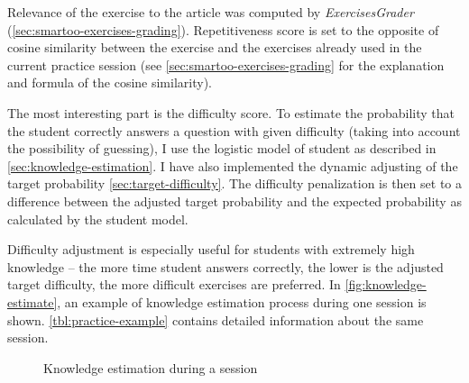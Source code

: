 \documentclass[12pt, twoside]{fithesis2}		%
\renewcommand{\_}{\leavevmode \kern0.07em\vbox{\hrule width0.4em}}
\begin{document}
Relevance of the exercise to the article was computed by \textit{ExercisesGrader}
(\autoref{sec:smartoo-exercises-grading}).
Repetitiveness score is set to the opposite of cosine similarity between the exercise and the exercises already used in the current practice session
(see \autoref{sec:smartoo-exercises-grading} for the explanation and formula of the cosine similarity).

The most interesting part is the difficulty score.
To estimate the probability that the student correctly answers a question with given difficulty (taking into account the possibility of guessing),
I use the logistic model of student as described in \autoref{sec:knowledge-estimation}.
I have also implemented the dynamic adjusting of the target probability \autoref{sec:target-difficulty}.
The difficulty penalization is then set to a difference between the adjusted target probability and the expected probability as calculated by the student model.

Difficulty adjustment is especially useful for students with extremely high knowledge -- the more time student answers correctly, the lower is the adjusted target difficulty, the more difficult exercises are preferred.
In \autoref{fig:knowledge-estimate}, an example of knowledge estimation process during one session is shown.
\autoref{tbl:practice-example} contains detailed information about the same session.

\begin{figure}[h]
\centering
{}
  \caption{Knowledge estimation during a session}
  \label{fig:knowledge-estimate}
\end{figure}
\end{document}
